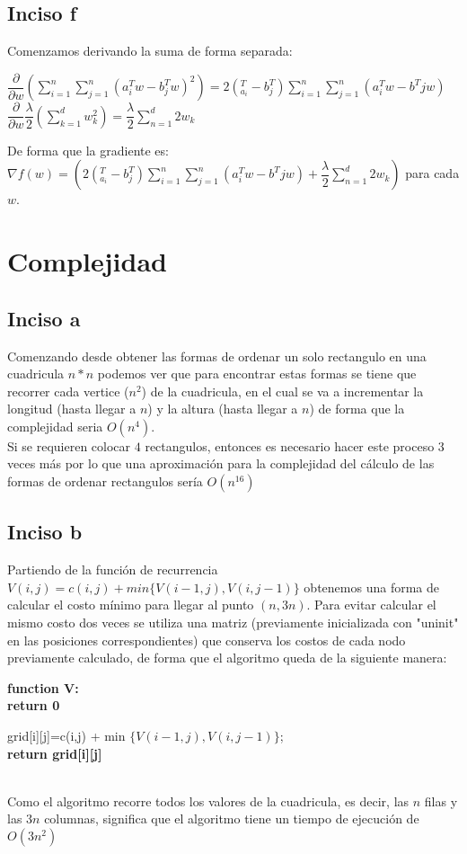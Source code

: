 \documentclass[11pt]{article}
\begin{document}
\subsection{Inciso f}
Comenzamos derivando la suma de forma separada:
\begin{center}
$\dfrac{\partial }{\partial w}\left( \sum ^{n}_{i=1}\sum ^{n}_{j=1}\left( a_{i}^{T}w-b_{j}^{T}w \right) ^{2}\right)=2\left( _{a_{i}}^{T}-b_{j}^{T}\right) \sum ^{n}_{i=1}\sum ^{n}_{j=1}\left( a_{i}^{T}w-b^{T}jw\right)$\\
$\dfrac{\partial }{\partial w}\dfrac{\lambda }{2}\left( \sum ^{d}_{k=1}w_{k}^{2}\right) =\dfrac{\lambda }{2}\sum ^{d}_{n=1}2w_{k}$
\end{center}
De forma que la gradiente es:
$\nabla f\left( w\right)=(2\left( _{a_{i}}^{T}-b_{j}^{T}\right) \sum ^{n}_{i=1}\sum ^{n}_{j=1}\left( a_{i}^{T}w-b^{T}jw\right)+\dfrac{\lambda }{2}\sum ^{d}_{n=1}2w_{k})$
para cada $w$.
\pagebreak
\section{Complejidad}
\subsection{Inciso a}
Comenzando desde obtener las formas de ordenar un solo rectangulo en una cuadricula $n * n$ podemos ver que para encontrar estas formas se tiene que recorrer cada vertice ($n^2$) de la cuadricula, en el cual se va a incrementar la longitud (hasta llegar a $n$) y la altura (hasta llegar a $n$) de forma que la complejidad seria $O(n^4)$.\\
Si se requieren colocar $4$ rectangulos, entonces es necesario hacer este proceso 3 veces más por lo que una aproximación para la complejidad del cálculo de las formas de ordenar rectangulos sería $O(n^{16})$
\subsection{Inciso b}
Partiendo de la función de recurrencia $V(i, j) = c(i, j) + min \{V(i-1, j), V(i, j-1)\}$ obtenemos una forma de calcular el costo mínimo para llegar al punto $(n, 3n)$. Para evitar calcular el mismo costo dos veces se utiliza una matriz (previamente inicializada con "uninit" en las posiciones correspondientes) que conserva los costos de cada nodo previamente calculado, de forma que el algoritmo queda de la siguiente manera:
\begin{algorithm}
\textbf{function V:}\\

{
	\textbf{return 0}
}

{
    grid[i][j]=c(i,j) + min $\{V(i-1, j), V(i, j-1)\}$;\\
}
	\textbf{return grid[i][j]}


\end{algorithm}\\
Como el algoritmo recorre todos los valores de la cuadricula, es decir, las $n$ filas y las $3n$ columnas, significa que el algoritmo tiene un tiempo de ejecución de \textbf{$O(3n^{2})$}
\end{document}
